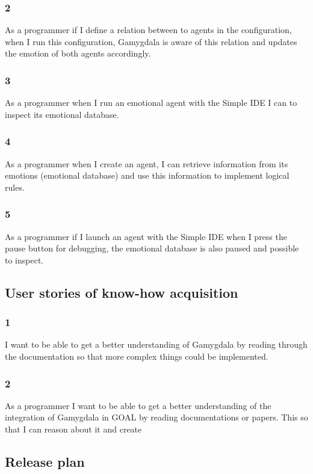 \documentclass[]{article}
\begin{document}
\subsubsection*{2}
As a programmer if I define a relation between to agents in the configuration, when I run this configuration, Gamygdala is aware of this relation and updates the emotion of both agents accordingly.

\subsubsection*{3}As a programmer when I run an emotional agent with the Simple IDE\cite{SimpleIDE} I can to inspect its emotional database.

\subsubsection*{4}As a programmer when I create an agent, I can retrieve information from its emotions (emotional database) and use this information to implement logical rules.

\subsubsection*{5} As a programmer if I launch an agent with the Simple IDE \cite{SimpleIDE} when I press the pause button for debugging, the emotional database is also paused and possible to inspect.



\subsection{User stories of know-how acquisition}
\subsubsection*{1}
I want to be able to get a better understanding of Gamygdala by reading through the documentation so that more complex things could be implemented.

\subsubsection*{2}As a programmer I want to be able to get a better understanding of the integration of Gamygdala in GOAL by reading documentations or papers. This so that I can reason about it and create 

\subsection{Release plan}
\end{document}
